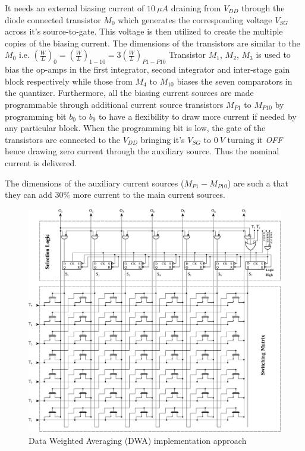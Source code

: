 It needs an external biasing current of $10~\mu A$ draining from $V_{DD}$ through the diode connected transistor $M_0$ which generates the corresponding voltage $V_{SG}$ across it's source-to-gate. This voltage is then utilized to create the multiple copies of the biasing current. The dimensions of the transistors are similar to the $M_0$ i.e. $\left(\frac{W}{L}\right)_0=\left(\frac{W}{L}\right)_{1-10}=3\left(\frac{W}{L}\right)_{P1-P10}$ Transistor $M_1$, $M_2$, $M_3$ is used to bias the op-amps in the first integrator, second integrator and inter-stage gain block respectively while those from $M_4$ to $M_{10}$ biases the seven comparators in the quantizer. Furthermore, all the biasing current sources are made programmable through additional current source transistors $M_{P1}$ to $M_{P10}$ by programming bit $b_0$ to $b_9$ to have a flexibility to draw more current if needed by any particular block. When the programming bit is low, the gate of the transistors are connected to the $V_{DD}$ bringing it's $V_{SG}$ to $0~V$ turning it \textit{OFF} hence drawing zero current through the auxiliary source. Thus the nominal current is delivered.

The dimensions of the auxiliary current sources ($M_{P1}-M_{P10}$) are such a that they can add $30\%$ more current to the main current sources. 
%
\begin{figure}[h!]
\centering
\includegraphics[width=\columnwidth]{Chap05/Figures/dwa_circuit.png}
\caption{Data Weighted Averaging (DWA) implementation approach}
\label{fig:dwa}
\end{figure}
%
